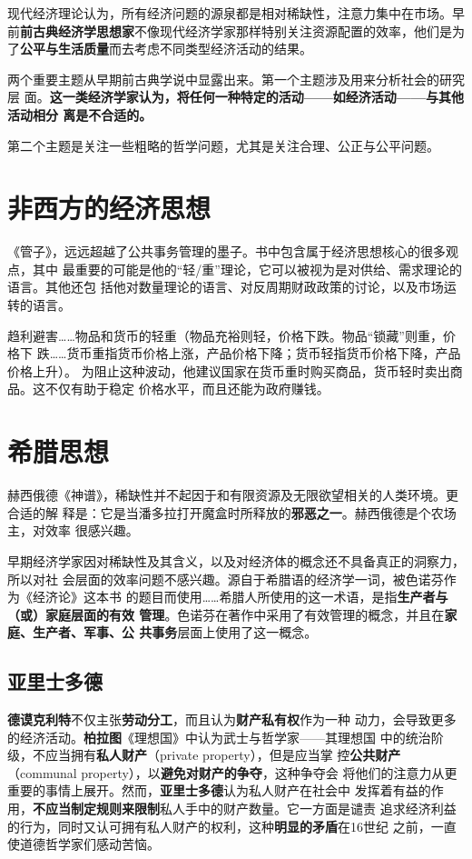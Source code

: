 现代经济理论认为，所有经济问题的源泉都是相对稀缺性，注意力集中在市场。早
前\textbf{前古典经济学思想家}不像现代经济学家那样特别关注资源配置的效率，他们是为
了\textbf{公平与生活质量}而去考虑不同类型经济活动的结果。

两个重要主题从早期前古典学说中显露出来。第一个主题涉及用来分析社会的研究层
面。\textbf{这一类经济学家认为，将任何一种特定的活动——如经济活动——与其他活动相分
  离是不合适的。}

第二个主题是关注一些粗略的哲学问题，尤其是关注合理、公正与公平问题。

\section{非西方的经济思想}

《管子》，远远超越了公共事务管理的墨子。书中包含属于经济思想核心的很多观点，其中
最重要的可能是他的“轻/重”理论，它可以被视为是对供给、需求理论的语言。其他还包
括他对数量理论的语言、对反周期财政政策的讨论，以及市场运转的语言。

趋利避害……物品和货币的轻重（物品充裕则轻，价格下跌。物品“锁藏”则重，价格下
跌……货币重指货币价格上涨，产品价格下降；货币轻指货币价格下降，产品价格上升）。
为阻止这种波动，他建议国家在货币重时购买商品，货币轻时卖出商品。这不仅有助于稳定
价格水平，而且还能为政府赚钱。

\section{希腊思想}

赫西俄德《神谱》，稀缺性并不起因于和有限资源及无限欲望相关的人类环境。更合适的解
释是：它是当潘多拉打开魔盒时所释放的\textbf{邪恶之一}。赫西俄德是个农场主，对效率
很感兴趣。

早期经济学家因对稀缺性及其含义，以及对经济体的概念还不具备真正的洞察力，所以对社
会层面的效率问题不感兴趣。源自于希腊语的经济学一词，被色诺芬作为《经济论》这本书
的题目而使用……希腊人所使用的这一术语，是指\textbf{生产者与（或）家庭层面的有效
  管理}。色诺芬在著作中采用了有效管理的概念，并且在\textbf{家庭、生产者、军事、公
  共事务}层面上使用了这一概念。

\subsection{亚里士多德}

\textbf{德谟克利特}不仅主张\textbf{劳动分工}，而且认为\textbf{财产私有权}作为一种
动力，会导致更多的经济活动。\textbf{柏拉图}《理想国》中认为武士与哲学家——其理想国
中的统治阶级，不应当拥有\textbf{私人财产}（private property），但是应当掌
控\textbf{公共财产}（communal property），以\textbf{避免对财产的争夺}，这种争夺会
将他们的注意力从更重要的事情上展开。然而，\textbf{亚里士多德}认为私人财产在社会中
发挥着有益的作用，\textbf{不应当制定规则来限制}私人手中的财产数量。它一方面是谴责
追求经济利益的行为，同时又认可拥有私人财产的权利，这种\textbf{明显的矛盾}在16世纪
之前，一直使道德哲学家们感动苦恼。

